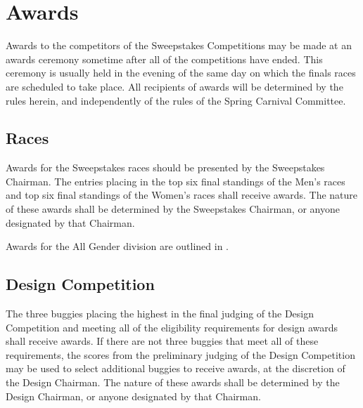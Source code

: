 \chapter{Awards}

	Awards to the competitors of the Sweepstakes Competitions may be made at an awards ceremony sometime after all of the competitions have ended. This ceremony is usually held in the evening of the same day on which the finals races are scheduled to take place. All recipients of awards will be determined by the rules herein, and independently of the rules of the Spring Carnival Committee.

\section{Races}

	Awards for the Sweepstakes races should be presented by the Sweepstakes Chairman. The entries placing in the top six final standings of the Men's races and top six final standings of the Women's races shall receive awards. The nature of these awards shall be determined by the Sweepstakes Chairman, or anyone designated by that Chairman.

	Awards for the All Gender division are outlined in \label{All Gender}. 


\section{Design Competition}

	The three buggies placing the highest in the final judging of the Design Competition and meeting all of the eligibility requirements for design awards shall receive awards. If there are not three buggies that meet all of these requirements, the scores from the preliminary judging of the Design Competition may be used to select additional buggies to receive awards, at the discretion of the Design Chairman. The nature of these awards shall be determined by the Design Chairman, or anyone designated by that Chairman.

